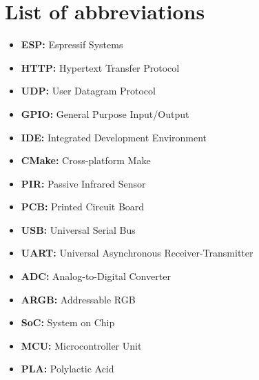     \section{List of abbreviations}
        \begin{itemize}
            \item \textbf{ESP:} Espressif Systems
            \item \textbf{HTTP:} Hypertext Transfer Protocol
            \item \textbf{UDP:} User Datagram Protocol
            \item \textbf{GPIO:} General Purpose Input/Output
            \item \textbf{IDE:} Integrated Development Environment
            \item \textbf{CMake:} Cross-platform Make
            \item \textbf{PIR:} Passive Infrared Sensor
            \item \textbf{PCB:} Printed Circuit Board
            \item \textbf{USB:} Universal Serial Bus
            \item \textbf{UART:} Universal Asynchronous Receiver-Transmitter
            \item \textbf{ADC:} Analog-to-Digital Converter
            \item \textbf{ARGB:} Addressable RGB
            \item \textbf{SoC:} System on Chip
            \item \textbf{MCU:} Microcontroller Unit
            \item \textbf{PLA:} Polylactic Acid
        \end{itemize}


    